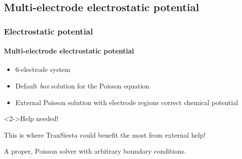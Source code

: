 \begin{frame}
\begin{block}
\begin{itemize}
\begin{itemize}[<+->]
      \end{itemize}
    \end{itemize}
    
  \end{block}
  
\end{frame}


\subsection{Multi-electrode electrostatic potential}

\begin{frame}
  \frametitle{Electrostatic potential}
  \framesubtitle{Multi-electrode electrostatic potential}

  \begin{itemize}
    \item 6-electrode system
    \item Default \emph{box} solution for the Poisson equation
    \item External Poisson solution with electrode regions correct chemical potential
  \end{itemize}

  \begin{center}
  \end{center}

  \begin{block}<2->{Help needed!}

    This is where TranSiesta could benefit the most from external help!

    A proper, Poisson solver with arbitrary boundary conditions.
    
  \end{block}
  
\end{frame}

